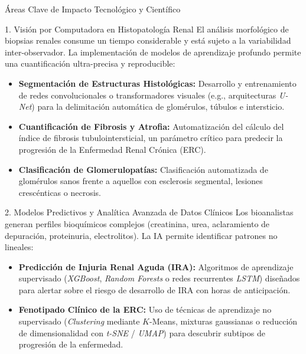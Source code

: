 \documentclass[12pt,letterpaper]{article}
\begin{document}
\begin{infobox}{Áreas Clave de Impacto Tecnológico y Científico}
    
    \begin{subbox}{1. Visión por Computadora en Histopatología Renal}
    El análisis morfológico de biopsias renales consume un tiempo considerable y está sujeto a la variabilidad inter-observador. La implementación de modelos de aprendizaje profundo permite una cuantificación ultra-precisa y reproducible:
    \begin{itemize}[leftmargin=*, label=\textcolor{secondarycolor}{\textbullet}]
        \item \textbf{Segmentación de Estructuras Histológicas:} Desarrollo y entrenamiento de redes convolucionales o transformadores visuales (e.g., arquitecturas \emph{U-Net}) para la delimitación automática de glomérulos, túbulos e intersticio.
        \item \textbf{Cuantificación de Fibrosis y Atrofia:} Automatización del cálculo del índice de fibrosis tubulointersticial, un parámetro crítico para predecir la progresión de la Enfermedad Renal Crónica (ERC).
        \item \textbf{Clasificación de Glomerulopatías:} Clasificación automatizada de glomérulos sanos frente a aquellos con esclerosis segmental, lesiones crescénticas o necrosis.
    \end{itemize}
    \end{subbox}

    \vspace{0.2cm}

    \begin{subbox}{2. Modelos Predictivos y Analítica Avanzada de Datos Clínicos}
    Los bioanalistas generan perfiles bioquímicos complejos (creatinina, urea, aclaramiento de depuración, proteinuria, electrolitos). La IA permite identificar patrones no lineales:
    \begin{itemize}[leftmargin=*, label=\textcolor{secondarycolor}{\textbullet}]
        \item \textbf{Predicción de Injuria Renal Aguda (IRA):} Algoritmos de aprendizaje supervisado (\emph{XGBoost}, \emph{Random Forests} o redes recurrentes \emph{LSTM}) diseñados para alertar sobre el riesgo de desarrollo de IRA con horas de anticipación.
        \item \textbf{Fenotipado Clínico de la ERC:} Uso de técnicas de aprendizaje no supervisado (\emph{Clustering} mediante $K$-Means, mixturas gaussianas o reducción de dimensionalidad con \emph{t-SNE} / \emph{UMAP}) para descubrir subtipos de progresión de la enfermedad.
    \end{itemize}
    \end{subbox}


\end{infobox}
\end{document}
